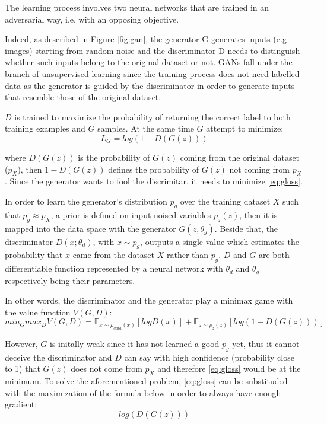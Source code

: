 The learning process involves two neural networks that are trained in an adversarial way, i.e. with an opposing objective.

Indeed, as described in Figure \ref{fig:gan}, the generator G generates inputs (e.g images) starting from random noise and the discriminator D needs to distinguish whether such inputs belong to the original dataset or not. GANs fall under the branch of unsupervised learning since the training process does not need labelled data as the generator is guided by the discriminator in order to generate inputs that resemble those of the original dataset.

$D$ is trained to maximize the probability of returning the correct label to both training examples and $G$ samples. At the same time $G$ attempt to minimize:
\begin{equation}
  \label{eq:gloss}
  L_G =log(1-D(G(z)))
\end{equation}

where $D(G(z))$ is the probability of $G(z)$ coming from the original dataset ($p_{X}$), then $1-D(G(z))$ defines the probability of $G(z)$ not coming from $p_{X}$. Since the generator wants to fool the discrimitar, it needs to minimize \ref{eq:gloss}.

In order to learn the generator's distribution $p_{g}$ over the training dataset $X$ such that $p_{g}\approx p_{X}$, a prior is defined on input noised variables $p_{z}(z)$, then it is mapped into the data space with the generator $G(z, \theta_{g})$. Beside that, the discriminator $D(x;\theta_{d})$, with $x \sim p_{g}$, outputs a single value which estimates the probability that $x$ came from the dataset $X$ rather than $p_{g}$. $D$ and $G$ are both differentiable function represented by a neural network with $\theta_{d}$ and $\theta_{g}$ respectively being their parameters.

In other words, the discriminator and the generator play a minimax game with the value function $V(G,D)$:
\begin{equation}
  \label{eq:ganloss}
  min_G max_D V(G,D) = \mathbb{E}_{x\sim \rho_{data}(x)}[log D(x)] + \mathbb{E}_{z\sim \rho_{z}(z)}[log (1-D(G(z)))]
\end{equation}

However, $G$ is initally weak since it has not learned a good $p_{g}$ yet, thus it cannot deceive the discriminator and $D$ can say with high confidence (probability close to 1) that $G(z)$ does not come from $p_{X}$ and therefore \ref{eq:gloss} would be at the minimum. To solve the aforementioned problem, \ref{eq:gloss} can be substituded with the maximization of the formula below in order to always have enough gradient:
\begin{equation}
  log(D(G(z)))
\end{equation}


